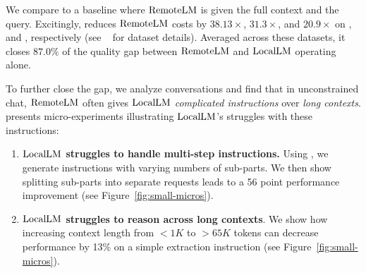 
We compare \naive to a baseline where $\mathrm{RemoteLM}$ is given the full context and the query. Excitingly, \naive reduces $\mathrm{RemoteLM}$ costs by $38.13\times$, $31.3\times$, and $20.9\times$ on \finance, \longhealth and \qasper, respectively (see ~ for dataset details).
Averaged across these datasets, it closes $87.0\%$ of the quality gap between $\mathrm{RemoteLM}$ and $\mathrm{LocalLM}$ operating alone. 

To further close the gap, we analyze \naive conversations and find that in unconstrained chat, $\mathrm{RemoteLM}$ often gives $\mathrm{LocalLM}$ \emph{complicated instructions} over \emph{long contexts}.  presents micro-experiments illustrating $\mathrm{LocalLM}$'s struggles with these instructions:
\begin{enumerate}
    \item \textbf{$\mathrm{LocalLM}$ struggles to handle multi-step instructions.} Using \gpt, we generate instructions with varying numbers of sub-parts. We then show splitting sub-parts into separate requests leads to a 56 point performance improvement (see Figure~\ref{fig:small-micros}).
    
    \item \textbf{$\mathrm{LocalLM}$ struggles to reason across long contexts}. We show how increasing context length from $<1K$ to $>65K$ tokens can decrease performance by 13\% on a simple extraction instruction (see Figure~\ref{fig:small-micros}).
\end{enumerate}


